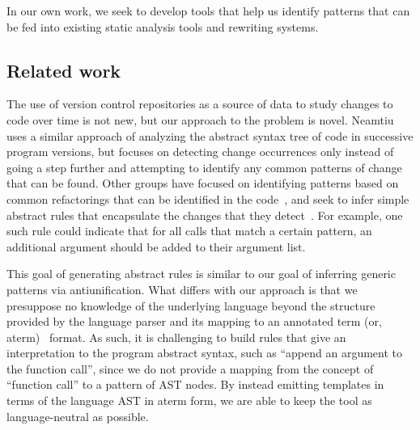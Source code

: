 
In our own work, we seek to develop tools that help us identify patterns that
can be fed into existing static analysis tools and rewriting systems.

\subsection{Related work}

The use of version control repositories as a source of data to study changes
to code over time is not new, but our approach to the problem is novel.
Neamtiu~\cite{neamtiu05understand} uses a similar approach of analyzing the
abstract syntax tree of code in successive program versions, but focuses on
detecting change occurrences only instead of going a step further and
attempting to identify any common patterns of change that can be found.  
Other groups have focused on identifying patterns based on common
refactorings that can be identified in the code~\cite{weissgerber06identify},
and seek to infer simple abstract rules that encapsulate the changes
that they detect~\cite{kim07automatic}.  For example, one such rule could
indicate that for all calls that match a certain pattern, an additional
argument should be added to their argument list.

This goal of generating abstract rules is similar to our goal of inferring
generic patterns via antiunification.  What differs with our approach is that
we presuppose no knowledge of the underlying language beyond the structure
provided by the language parser and its mapping to an annotated term (or,
aterm)~\cite{brand00aterm} format.  As such, it is challenging to build rules
that give an interpretation to the program abstract syntax, such as ``append an
argument to the function call'', since we do not provide a mapping from the
concept of ``function call'' to a pattern of AST nodes.  By instead emitting
templates in terms of the language AST in aterm form, we are able to keep the
tool as language-neutral as possible.
